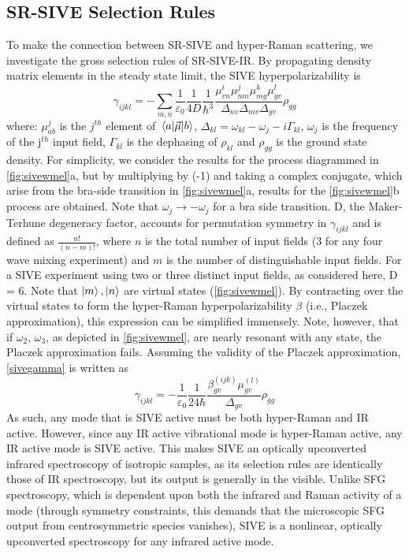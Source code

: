 \documentclass[aip, jcp, reprint, onecolumn]{revtex4-2}
\begin{document}
\subsection{SR-SIVE Selection Rules}
To make the connection between SR-SIVE and hyper-Raman scattering, we investigate the gross selection rules of SR-SIVE-IR.
By propagating density matrix elements in the steady state limit, the SIVE hyperpolarizability is \cite{RN119}
\begin{equation}\label{sivegamma}
		\gamma_{ijkl} =	- \sum_{m, n} \frac{1}{\varepsilon_0} \frac{1}{4D} \frac{1}{\hbar^3} \frac{\mu^{i}_{v n} \mu^{j}_{nm} \mu^{k}_{mg} \mu^{l}_{gv} }{\Delta_{nv} \Delta_{mv}\Delta_{gv}}  \rho_{gg}
\end{equation}
where: $\mu^{j}_{ab}$ is the $j^{th}$ element of $\mel{a}{\vec{\mu}}{b}$, $\Delta_{kl} = \omega_{kl} - \omega_{j} - i\Gamma_{kl}$, $\omega_j$ is the frequency of the j$^{th}$ input field, $\Gamma_{kl}$ is the dephasing of $\rho_{kl}$ and $\rho_{gg}$ is the ground state density.
For simplicity, we consider the results for the process diagrammed in \autoref{fig:sivewmel}a, but by multiplying by (-1) and taking a complex conjugate, which arise from the bra-side transition in \autoref{fig:sivewmel}a, results for the \autoref{fig:sivewmel}b  process are obtained.
Note that $\omega_j \rightarrow -\omega_j$ for a bra side transition.
D, the Maker-Terhune degeneracy factor, accounts for permutation symmetry in $\gamma_{ijkl}$ and is defined as $\frac{n!}{(n-m)!}$, where $n$ is the total number of input fields (3 for any four wave mixing experiment) and $m$ is the number of distinguishable input fields.\cite{RN134} 
For a SIVE experiment using two or three distinct input fields, as considered here, D = 6.
Note that $\ket{m}, \ket{n}$ are virtual states (\autoref{fig:sivewmel}).
By contracting over the virtual states to form the hyper-Raman hyperpolarizability $\beta$ (i.e., Placzek approximation), this expression can be simplified immensely.\cite{Long1970} 
Note, however, that if $\omega_2$, $\omega_3$, as depicted in \autoref{fig:sivewmel}, are nearly resonant with any state, the Placzek approximation fails. \cite{Placzek1937, Long1970}
Assuming the validity of the Placzek approximation, \autoref{sivegamma} is written as 
\begin{equation}\label{sivebeta}
	\gamma_{ijkl} =	-\frac{1}{\varepsilon_0} \frac{1}{24 \hbar}\frac{\beta^{(ijk)}_{gv} \mu^{(l)}_{gv}}{\Delta_{gv}} \rho_{gg}
\end{equation}
As such, any mode that is SIVE active must be both hyper-Raman and IR active.
However, since any IR active vibrational mode is hyper-Raman active,\cite{Cyvin1965, Andrews1978} any IR active mode is SIVE active.
This makes SIVE an optically upconverted infrared spectroscopy of isotropic samples, as its selection rules are identically those of IR spectroscopy, but its output is generally in the visible.
Unlike SFG spectroscopy, which is dependent upon both the infrared and Raman activity of a mode (through symmetry constraints, this demands that the microscopic SFG output from centrosymmetric species vanishes),\cite{Shen90, Cotton} SIVE is a nonlinear, optically upconverted spectroscopy for any infrared active mode.
\end{document}
